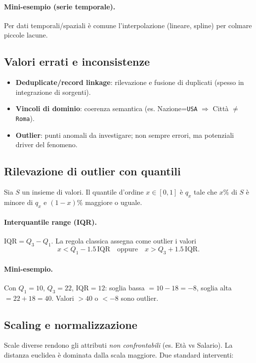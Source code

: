 \paragraph{Mini-esempio (serie temporale).} Per dati temporali/spaziali è comune l'interpolazione (lineare, spline) per colmare piccole lacune.

\subsection{Valori errati e inconsistenze}\label{subsec:errors}
\begin{itemize}
  \item \textbf{Deduplicate/record linkage}: rilevazione e fusione di duplicati (spesso in integrazione di sorgenti).
  \item \textbf{Vincoli di dominio}: coerenza semantica (es. Nazione=\texttt{USA} \(\Rightarrow\) Città \(\neq\) \texttt{Roma}).
  \item \textbf{Outlier}: punti anomali da investigare; non sempre errori, ma potenziali driver del fenomeno.
\end{itemize}

\subsection{Rilevazione di outlier con quantili}\label{subsec:quantili}
Sia $S$ un insieme di valori. Il quantile d'ordine $x\in[0,1]$ è $q_x$ tale che $x\%$ di $S$ è minore di $q_x$ e $(1-x)\%$ maggiore o uguale.
\paragraph{Interquantile range (IQR).} $\mathrm{IQR}=Q_3-Q_1$. La regola classica assegna come outlier i valori
\[
  x< Q_1-1.5\,\mathrm{IQR}\quad \text{oppure}\quad x> Q_3+1.5\,\mathrm{IQR}.
\]
\paragraph{Mini-esempio.} Con $Q_1=10$, $Q_3=22$, $\mathrm{IQR}=12$: soglia bassa $=10-18=-8$, soglia alta $=22+18=40$. Valori $>40$ o $<-8$ sono outlier.

\subsection{Scaling e normalizzazione}\label{subsec:scaling}
Scale diverse rendono gli attributi \emph{non confrontabili} (es. Età vs Salario). La distanza euclidea è dominata dalla scala maggiore. Due standard interventi:
